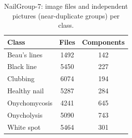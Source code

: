 \begin{table}[!tbp]
\centering
\caption{NailGroup-7: image files and independent pictures (near-duplicate groups) per class.}
\label{tab:devclasses}
\footnotesize
\begin{tabular}{lcc}
\hline
Class & Files & Components \\
\hline
Beau's lines & 1492 & 142 \\
Black line & 5450 & 227 \\
Clubbing & 6074 & 194 \\
Healthy nail & 5287 & 284 \\
Onychomycosis & 4241 & 645 \\
Onycholysis & 5090 & 743 \\
White spot & 5464 & 301 \\
\hline
\end{tabular}
\end{table}